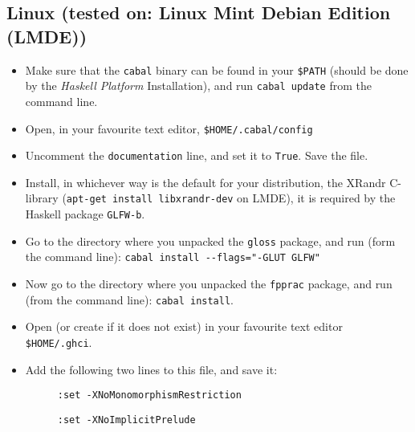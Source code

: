 \documentclass[]{article}
\begin{document}
\subsection{Linux (tested on: Linux Mint Debian Edition (LMDE))}
\begin{itemize}
  \item Make sure that the \texttt{cabal} binary can be found in your \texttt{\$PATH} (should be done by the \emph{Haskell Platform} Installation), and run \texttt{cabal update} from the command line.
  \item Open, in your favourite text editor, \texttt{\$HOME/.cabal/config}
  \item Uncomment the \texttt{documentation} line, and set it to \texttt{True}. Save the file.
  \item Install, in whichever way is the default for your distribution, the XRandr C-library (\texttt{apt-get install libxrandr-dev} on LMDE), it is required by the Haskell package \texttt{GLFW-b}.
  \item Go to the directory where you unpacked the \texttt{gloss} package, and run (form the command line): \texttt{cabal install -{}-flags="-GLUT GLFW"}
  \item Now go to the directory where you unpacked the \texttt{fpprac} package, and run (from the command line): \texttt{cabal install}.
  \item Open (or create if it does not exist) in your favourite text editor \texttt{\$HOME/.ghci}.
  \item Add the following two lines to this file, and save it:
  \begin{description}
    \item[] \texttt{:set -XNoMonomorphismRestriction}
    \item[] \texttt{:set -XNoImplicitPrelude}
  \end{description}
\end{itemize}
\end{document}
